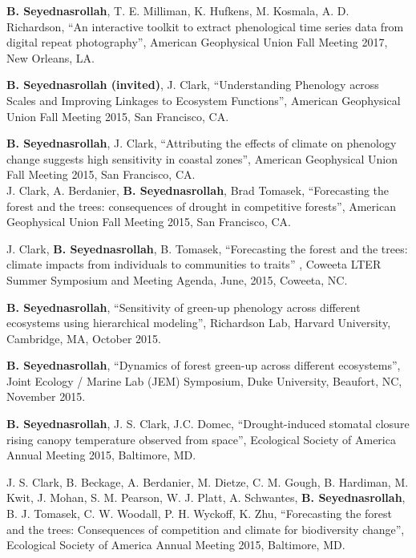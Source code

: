 \documentclass[10pt]{article}
\newenvironment{changemargin}[2]{%
  \begin{list}{}{%
    \setlength{\topsep}{0pt}%
    \setlength{\leftmargin}{#1}%
    \setlength{\rightmargin}{#2}%
    \setlength{\listparindent}{\parindent}%
    \setlength{\itemindent}{\parindent}%
    \setlength{\parsep}{\parskip}%
  }%
  \item[]}{\end{list}
}
\newenvironment{body} {
	\vspace*{-2pt}
	\begin{changemargin}{-0.5in}{-0.5in}
  }
	{\end{changemargin}
}
\begin{document}
\begin{body}
   \textbf{B. Seyednasrollah}, T. E. Milliman, K. Hufkens, M. Kosmala, A. D. Richardson, ``An interactive toolkit to extract phenological time series data from digital repeat photography'', American Geophysical Union Fall Meeting 2017, New Orleans, LA.\\
\medskip

   \textbf{B. Seyednasrollah (invited)}, J. Clark, ``Understanding Phenology across Scales and Improving Linkages to Ecosystem Functions'', American Geophysical Union Fall Meeting 2015, San Francisco, CA.\\
\medskip

   \textbf{B. Seyednasrollah}, J. Clark, ``Attributing the effects of climate on phenology change suggests high sensitivity in coastal zones'', American Geophysical Union Fall Meeting 2015, San Francisco, CA.\\
  \medskip
     J. Clark, A. Berdanier, \textbf{B. Seyednasrollah}, Brad Tomasek, ``Forecasting the forest and the trees: consequences of drought in competitive forests'', American Geophysical Union Fall Meeting 2015, San Francisco, CA.\\
\medskip

   J. Clark, \textbf {B. Seyednasrollah}, B.  Tomasek, ``Forecasting the forest and the trees: climate impacts from individuals to communities to traits'' , Coweeta LTER Summer Symposium and Meeting Agenda, June, 2015, Coweeta, NC.\\
\medskip

   \textbf{B. Seyednasrollah}, ``Sensitivity of green-up phenology across different ecosystems using hierarchical modeling'', Richardson Lab, Harvard University, Cambridge, MA, October 2015.\\
\medskip

   \textbf{B. Seyednasrollah}, ``Dynamics of forest green-up across different ecosystems'', Joint Ecology / Marine Lab (JEM) Symposium, Duke University, Beaufort, NC, November 2015.\\
\medskip

	 \textbf{B. Seyednasrollah}, J. S. Clark, J.C. Domec, ``Drought-induced stomatal closure rising canopy temperature observed from space'', Ecological Society of America Annual Meeting 2015, Baltimore, MD.\\
\medskip

   J. S. Clark, B. Beckage, A. Berdanier, M. Dietze, C. M. Gough, B. Hardiman, M. Kwit, J. Mohan, S. M. Pearson, W. J. Platt, A. Schwantes, \textbf{B. Seyednasrollah}, B. J. Tomasek, C. W. Woodall, P. H. Wyckoff, K. Zhu, ``Forecasting the forest and the trees: Consequences of competition and climate for biodiversity change'', Ecological Society of America Annual Meeting 2015, Baltimore, MD.\\
\medskip


\end{body}
\end{document}

